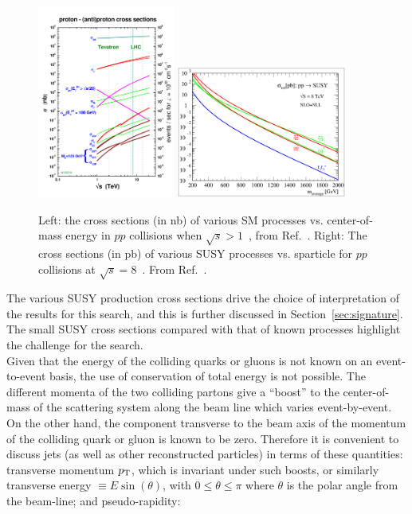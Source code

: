 \begin{figure}[h!]
  \begin{center}
      \includegraphics[width=0.40\textwidth,trim=0 2cm 0 0]{figures/crosssections2012_v5}
      \includegraphics[width=0.5\textwidth, ]{figures/nlonll_lhc8_tpformat.eps}
      \caption{\label{fig:crossSec} Left: the cross sections (in nb) of various SM processes vs. center-of-mass
              energy in $pp$ collisions when $\sqrt{s}>1$~\TeV, from Ref.~\cite{stirling-xs}. Right: 
              The cross sections (in pb) of various SUSY processes vs. sparticle for $pp$ collisions
              at $\sqrt{s}=8$~\TeV. From Ref.~\cite{Beenakker:1996ed}.} 
  \end{center}
\end{figure}

The various SUSY production cross sections drive the choice of interpretation 
of the results for this search, and this is further discussed in Section~\ref{sec:signature}. 
The small SUSY cross sections compared with that of known processes highlight 
the challenge for the search.\\
\indent Given that the energy of the colliding quarks or gluons is not known on 
an event-to-event basis, the use of conservation of total energy is not possible. 
The different momenta of the two colliding partons give a ``boost'' to the center-of-mass 
of the scattering system along the beam line which varies event-by-event. On the other hand, 
the component transverse to the beam axis of the momentum of the colliding quark or gluon is 
known to be zero. Therefore it is convenient to discuss jets (as well as other reconstructed 
particles) in terms of these quantities: transverse momentum $p_{\mathrm{T}}$, which is invariant under 
such boosts, or similarly transverse energy $\equiv E \sin\left(\theta\right)$, with 
$0 \leq \theta \leq \pi$ where $\theta$ is the polar angle from the beam-line; and pseudo-rapidity:

